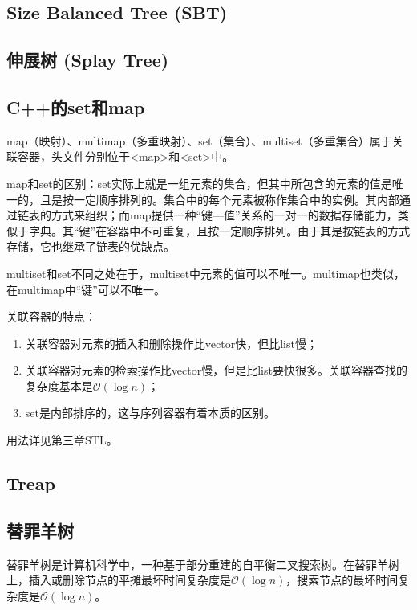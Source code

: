 \subsection{Size Balanced Tree (SBT)}


\subsection{伸展树 (Splay Tree)}


\subsection{C++的set和map}

map（映射）、multimap（多重映射）、set（集合）、multiset（多重集合）属于关联容器，头文件分别位于<map>和<set>中。

map和set的区别：set实际上就是一组元素的集合，但其中所包含的元素的值是唯一的，且是按一定顺序排列的。集合中的每个元素被称作集合中的实例。其内部通过链表的方式来组织；而map提供一种“键—值”关系的一对一的数据存储能力，类似于字典。其“键”在容器中不可重复，且按一定顺序排列。由于其是按链表的方式存储，它也继承了链表的优缺点。

multiset和set不同之处在于，multiset中元素的值可以不唯一。multimap也类似，在multimap中“键”可以不唯一。

关联容器的特点：

\begin{enumerate}
  \item 关联容器对元素的插入和删除操作比vector快，但比list慢；
  \item 关联容器对元素的检索操作比vector慢，但是比list要快很多。关联容器查找的复杂度基本是$\mathcal{O}(\log n)$；
  \item set是内部排序的，这与序列容器有着本质的区别。
\end{enumerate}

用法详见第三章STL。
    
\subsection{Treap}


\subsection{替罪羊树}

替罪羊树是计算机科学中，一种基于部分重建的自平衡二叉搜索树。在替罪羊树上，插入或删除节点的平摊最坏时间复杂度是$\mathcal{O}(\log n)$，搜索节点的最坏时间复杂度是$\mathcal{O}(\log n)$。


